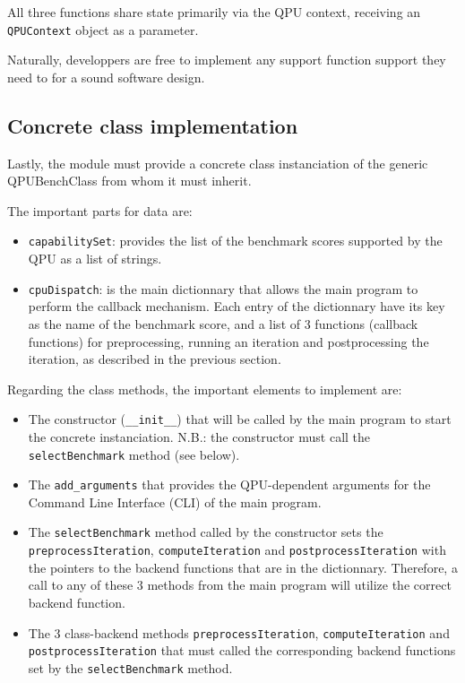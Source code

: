All three functions share state primarily via the QPU context, receiving an \texttt{QPUContext} object as a parameter.

Naturally, developpers are free to implement any support function support they need to for a sound software design.

\subsection{Concrete class implementation}

Lastly, the module must provide a concrete class instanciation of the generic QPUBenchClass from whom it must inherit.

The important parts for data are:
\begin{itemize}
	\item \texttt{capabilitySet}: provides the list of the benchmark scores supported by the QPU as a list of strings.
	\item \texttt{cpuDispatch}: is the main dictionnary that allows the main program to perform the callback mechanism. Each entry of the dictionnary have its key as the name of the benchmark score, and a list of 3 functions (callback functions) for preprocessing, running an iteration and postprocessing the iteration, as described in the previous section.
\end{itemize}

Regarding the class methods, the important elements to implement are:
\begin{itemize}
	\item The constructor (\texttt{\_\_init\_\_}) that will be called by the main program to start the concrete instanciation. N.B.: the constructor must call the \texttt{selectBenchmark} method (see below).
	\item The \texttt{add\_arguments} that provides the QPU-dependent arguments for the Command Line Interface (CLI) of the main program.
	\item The \texttt{selectBenchmark} method called by the constructor sets the \texttt{preprocessIteration}, \texttt{computeIteration} and \texttt{postprocessIteration} with the pointers to the backend functions that are in the dictionnary. Therefore, a call to any of these 3 methods from the main program will utilize the correct backend function.
	\item The 3 class-backend methods \texttt{preprocessIteration}, \texttt{computeIteration} and \texttt{postprocessIteration} that must called the corresponding backend functions set by the \texttt{selectBenchmark} method.
\end{itemize}

